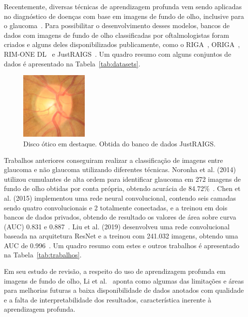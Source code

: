 \documentclass[12pt]{article}
\begin{document}
Recentemente, diversas técnicas de aprendizagem profunda vem sendo aplicadas no diagnóstico de doenças com base em imagens de fundo de olho, inclusive para o glaucoma~\cite{li_review_2021}. Para possibilitar o desenvolvimento desses modelos, bancos de dados com imagens de fundo de olho classificadas por oftalmologistas foram criados e alguns deles disponibilizados publicamente, como o RIGA~\cite{riga}, ORIGA~\cite{origa}, RIM-ONE DL~\cite{RIMONEDL} e JustRAIGS~\cite{justraigs}. Um quadro resumo com alguns conjuntos de dados é apresentado na Tabela~\ref{tab:datasets}. 

\begin{figure}[htb]
 \centering
 \includegraphics[width=0.3\textwidth]{images/disk.jpg}
 \caption{Disco ótico em destaque. Obtida do banco de dados JustRAIGS.}
 \label{fig:disk}
\end{figure}

Trabalhos anteriores conseguiram realizar a classificação de imagens entre glaucoma e não glaucoma utilizando diferentes técnicas. Noronha et al. (2014) utilizou cumulantes de alta ordem para identificar glaucoma em 272 imagens de fundo de olho obtidas por conta própria, obtendo acurácia de 84.72\%~\cite{noronha2014hoc}. Chen et al. (2015) implementou uma rede neural convolucional, contendo seis camadas sendo quatro convolucionais e 2 totalmente conectadas, e a treinou em dois bancos de dados privados, obtendo de resultado os valores de área sobre curva (AUC) 0.831 e 0.887~\cite{chen2015cnn}. Liu et al. (2019) desenvolveu uma rede convolucional baseada na arquitetura ResNet e a treinou com 241.032 imagens, obtendo uma AUC de 0.996~\cite{liu_cnn_2019}. Um quadro resumo com estes e outros trabalhos é apresentado na Tabela~\ref{tab:trabalhos}.

Em seu estudo de revisão, a respeito do uso de aprendizagem profunda em imagens de fundo de olho, Li et al.~\cite{li_review_2021} aponta como algumas das limitações e áreas para melhorias futuras a baixa disponibilidade de dados anotados com qualidade e a falta de interpretabilidade dos resultados, característica inerente à aprendizagem profunda.
\end{document}

